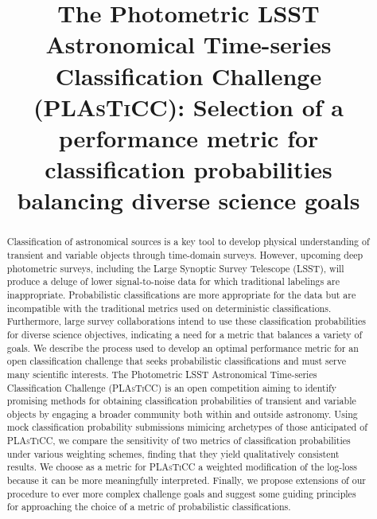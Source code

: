 \documentclass[\docopts]{\docclass}
\begin{document}
\linenumbers

\title{The Photometric \textsc{LSST} Astronomical Time-series Classification Challenge (\textsc{PLAsTiCC}): Selection of a performance metric for classification probabilities balancing diverse science goals}

\maketitlepre

\begin{abstract}
Classification of astronomical sources is a key tool to develop physical understanding of transient and variable objects through time-domain surveys.
  However, upcoming deep photometric surveys, including the Large Synoptic Survey Telescope (\textsc{LSST}), will produce a deluge of lower signal-to-noise data for which traditional labelings are inappropriate.
  Probabilistic classifications are more appropriate for the data but are incompatible with the traditional metrics used on deterministic classifications.
  Furthermore, large survey collaborations intend to use these classification probabilities for diverse science objectives, indicating a need for a metric that balances a variety of goals.
  We describe the process used to develop an optimal performance metric for an open classification challenge that seeks probabilistic classifications and must serve many scientific interests.
  The Photometric \textsc{LSST} Astronomical Time-series Classification Challenge (\textsc{PLAsTiCC}) is an open competition aiming to identify promising methods for obtaining classification probabilities of transient and variable objects by engaging a broader community both within and outside astronomy.
  Using mock classification probability submissions mimicing archetypes of those anticipated of \textsc{PLAsTiCC}, we compare the sensitivity of two metrics of classification probabilities under various weighting schemes, finding that they yield qualitatively consistent results.
  We choose as a metric for \textsc{PLAsTiCC} a weighted modification of the log-loss because it can be more meaningfully interpreted.
  Finally, we propose extensions of our procedure to ever more complex challenge goals and suggest some guiding principles for approaching the choice of a metric of probabilistic classifications.
\end{abstract}
\dockeys{}

\maketitlepost

\end{document}
